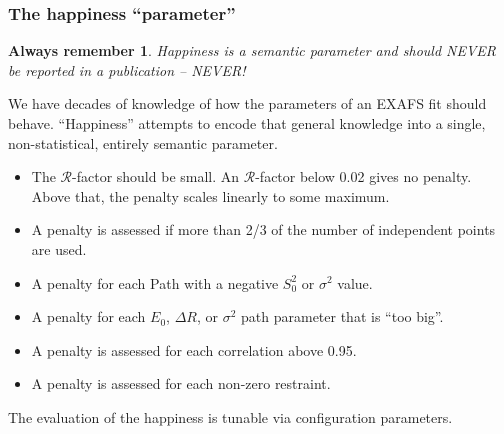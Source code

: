 \documentclass[10pt, xcolor=x11names, compress, handout]{beamer}
\newtheorem{remember}[theorem]{Always remember}
\begin{document}
\begin{frame}
  \frametitle{The happiness ``parameter''}
  \small
  \begin{remember}
    Happiness is a semantic parameter and should NEVER be reported in
    a publication -- NEVER!
  \end{remember}
  We have decades of knowledge of how the parameters of an EXAFS fit
  should behave.  ``Happiness'' attempts to encode that general
  knowledge into a single, non-statistical, entirely semantic parameter.
  \begin{itemize}
  \item The $\mathcal{R}$-factor should be small.  An
    $\mathcal{R}$-factor below 0.02 gives no penalty. Above that, the
    penalty scales linearly to some maximum.
  \item A penalty is assessed if more than 2/3 of the number of
    independent points are used.
  \item A penalty for each Path with a negative $S_0^2$ or $\sigma^2$
    value.
  \item A penalty for each $E_0$, $\Delta R$, or $\sigma^2$ path
    parameter that is ``too big''.
  \item A penalty is assessed for each correlation above 0.95.
  \item A penalty is assessed for each non-zero restraint.
  \end{itemize}
  The evaluation of the happiness is tunable via configuration parameters.
\end{frame}
\end{document}

